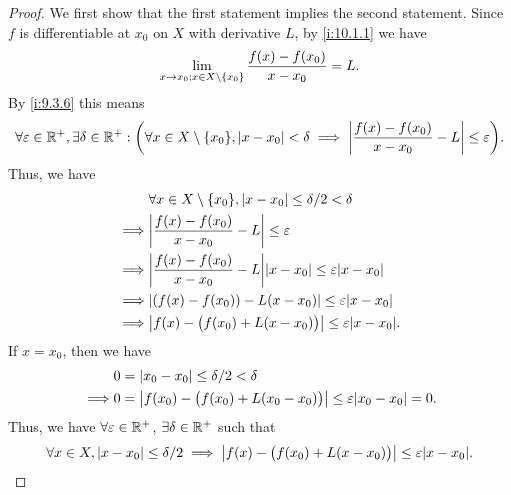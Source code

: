 \begin{proof}
  We first show that the first statement implies the second statement.
  Since \(f\) is differentiable at \(x_0\) on \(X\) with derivative \(L\), by \cref{i:10.1.1} we have
  \[
    \lim_{x \to x_0 ; x \in X \setminus \left\lbrace x_0\right\rbrace} \dfrac{f(x) - f(x_0)}{x - x_0} = L.
  \]
  By \cref{i:9.3.6} this means
  \[
    \forall \varepsilon \in \R^+, \exists \delta \in \R^+ : \bigg(\forall x \in X \setminus \set{x_0}, \abs{x - x_0} < \delta \implies \abs{\dfrac{f(x) - f(x_0)}{x - x_0} - L} \leq \varepsilon\bigg).
  \]
  Thus, we have
  \begin{align*}
             & \forall x \in X \setminus \set{x_0}, \abs{x - x_0} \leq \delta / 2 < \delta           \\
    \implies & \abs{\dfrac{f(x) - f(x_0)}{x - x_0} - L} \leq \varepsilon                             \\
    \implies & \abs{\dfrac{f(x) - f(x_0)}{x - x_0} - L} \abs{x - x_0} \leq \varepsilon \abs{x - x_0} \\
    \implies & \abs{(f(x) - f(x_0)) - L(x - x_0)} \leq \varepsilon \abs{x - x_0}                     \\
    \implies & \abs{f(x) - \big(f(x_0) + L(x - x_0)\big)} \leq \varepsilon \abs{x - x_0}.
  \end{align*}
  If \(x = x_0\), then we have
  \begin{align*}
             & 0 = \abs{x_0 - x_0} \leq \delta / 2 < \delta                                             \\
    \implies & 0 = \abs{f(x_0) - \big(f(x_0) + L(x_0 - x_0)\big)} \leq \varepsilon \abs{x_0 - x_0} = 0.
  \end{align*}
  Thus, we have \(\forall \varepsilon \in \mathbb{R}^+\), \(\exists \delta \in \mathbb{R}^+\) such that
  \[
    \forall x \in X, \abs{x - x_0} \leq \delta / 2 \implies \abs{f(x) - \big(f(x_0) + L(x - x_0)\big)} \leq \varepsilon \abs{x - x_0}.
  \]


\end{proof}
